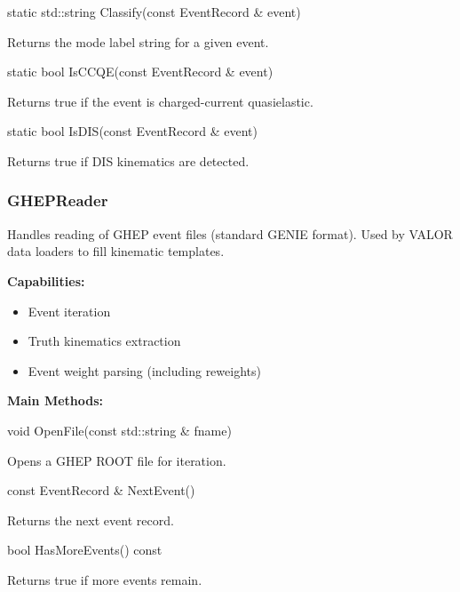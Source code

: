\begin{description}[align=left]

  \item[] {\color{cadmiumred} static std::string Classify(const EventRecord \& event)}

  Returns the mode label string for a given event.

  \item[] {\color{cadmiumred} static bool IsCCQE(const EventRecord \& event)}

  Returns true if the event is charged-current quasielastic.

  \item[] {\color{cadmiumred} static bool IsDIS(const EventRecord \& event)}

  Returns true if DIS kinematics are detected.

\end{description}

\vspace{1em}
\subsubsection*{\color{cadmiumgreen}\bf GHEPReader}

Handles reading of GHEP event files (standard GENIE format).  
Used by VALOR data loaders to fill kinematic templates.

\vspace{0.5em}
\noindent\textbf{Capabilities:}

\begin{itemize}
  \item Event iteration
  \item Truth kinematics extraction
  \item Event weight parsing (including reweights)
\end{itemize}

\vspace{0.5em}
\noindent\textbf{Main Methods:}

\begin{description}[align=left]

  \item[] {\color{cadmiumred} void OpenFile(const std::string \& fname)}

  Opens a GHEP ROOT file for iteration.

  \item[] {\color{cadmiumred} const EventRecord \& NextEvent()}

  Returns the next event record.

  \item[] {\color{cadmiumred} bool HasMoreEvents() const}

  Returns true if more events remain.

\end{description}

